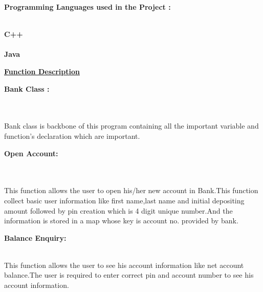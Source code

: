 \documentclass[11pt, a4paper]{article}
\begin{document}
\vspace{1cm}
\newline
\vspace{1cm}
\begin{left}
    \textbf{\LARGE{Programming Languages used in the Project :}}
\end{left}
\\
\newline
\textbullet \textbf{\hspace{1cm}C++}\\\\
\textbullet \textbf{\hspace{1cm}Java}
\newpage
\vspace{1cm}
\begin{center}
    \LARGE{\textbf\underline{{Function Description}}}
\end{center}
\hline
\vspace{1cm}


\begin{left}
    \textbf{\Large{\hspace{0.5cm}Bank Class :}}
\end{left}
\\\\\large{
{Bank class is backbone of this program containing  all the important variable and function's declaration which are important. 
}}
\\
\vspace{0.5cm}

\begin{left}
    \textbf{\Large{Open Account:}}
\end{left}
\\\\
\large
{
This function allows the user to open his/her new account in Bank.This function collect basic user information like first name,last name and initial depositing amount followed by pin creation which is 4 digit unique number.And the information is stored in a map whose key is account no. provided by  bank.
}
\\
\vspace{0.5cm}

\begin{left}
    \textbf{\Large{Balance Enquiry:}}
\end{left}
\vspace{0.5cm}
\large{\\This function allows the user to see his account information like net account balance.The user is required to enter correct pin and account number to see his account information.
}
\\
\vspace{0.5cm}
\end{document}
